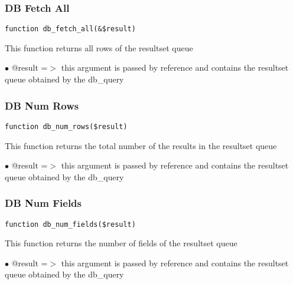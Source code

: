 \documentclass[a4paper]{article}
\begin{document}
\hypertarget{toc89}{}
\subsubsection{DB Fetch All}

\begin{lstlisting}
function db_fetch_all(&$result)
\end{lstlisting}

This function returns all rows of the resultset queue

\begin{compactitem}
\item[\color{myblue}$\bullet$] @result =$>$ this argument is passed by reference and contains the resultset queue
           obtained by the db\_query
\end{compactitem}

\hypertarget{toc90}{}
\subsubsection{DB Num Rows}

\begin{lstlisting}
function db_num_rows($result)
\end{lstlisting}

This function returns the total number of the results in the resultset queue

\begin{compactitem}
\item[\color{myblue}$\bullet$] @result =$>$ this argument is passed by reference and contains the resultset queue
           obtained by the db\_query
\end{compactitem}

\hypertarget{toc91}{}
\subsubsection{DB Num Fields}

\begin{lstlisting}
function db_num_fields($result)
\end{lstlisting}

This function returns the number of fields of the resultset queue

\begin{compactitem}
\item[\color{myblue}$\bullet$] @result =$>$ this argument is passed by reference and contains the resultset queue
           obtained by the db\_query
\end{compactitem}
\end{document}
